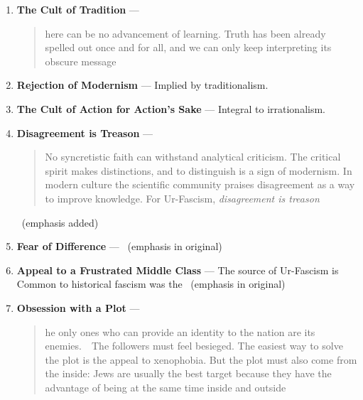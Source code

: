 \documentclass[../butidigress.tex]{subfiles}
\begin{document}
\begin{enumerate}
    \item \textbf{The Cult of Tradition} --- \blockquote[][.]{here can be no advancement of learning. Truth has been already spelled out once and for all, and we can only keep interpreting its obscure message}
    \item \textbf{Rejection of Modernism} --- Implied by traditionalism. 
    \item \textbf{The Cult of Action for Action's Sake} --- Integral to irrationalism. 
    \item \textbf{Disagreement is Treason} --- \blockquote[][.]{No syncretistic faith can withstand analytical criticism. The critical spirit makes distinctions, and to distinguish is a sign of modernism. In modern culture the scientific community praises disagreement as a way to improve knowledge. For Ur-Fascism, \emph{disagreement is treason}}~(emphasis added)
    \item \textbf{Fear of Difference} --- ~(emphasis in original)
    \item \textbf{Appeal to a Frustrated Middle Class} --- The source of Ur-Fascism is  Common to historical fascism was the ~(emphasis in original)
    \item \textbf{Obsession with a Plot} --- \blockquote[][.]{he only ones who can provide an identity to the nation are its enemies.~\lips\ The followers must feel besieged. The easiest way to solve the plot is the appeal to xenophobia. But the plot must also come from the inside: Jews are usually the best target because they have the advantage of being at the same time inside and outside}

\end{enumerate}
\end{document}
